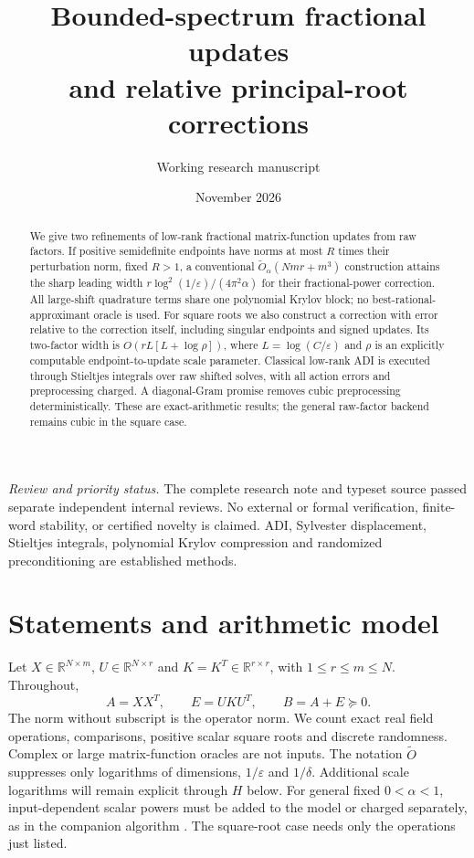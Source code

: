 \documentclass[11pt]{article}
\title{Bounded-spectrum fractional updates\protect\\
and relative principal-root corrections}
\author{Working research manuscript}
\date{November 2026}
\numberwithin{equation}{section}
\newcommand{\R}{\mathbb R}
\begin{document}
\maketitle

\begin{abstract}
We give two refinements of low-rank fractional matrix-function updates
from raw factors. If positive semidefinite endpoints have norms at most
$R$ times their perturbation norm, fixed $R>1$, a conventional
$\widetilde O_\alpha(Nmr+m^3)$ construction attains the sharp leading
width $r\log^2(1/\varepsilon)/(4\pi^2\alpha)$ for their fractional-power
correction. All large-shift quadrature terms share one polynomial Krylov
block; no best-rational-approximant oracle is used. For square roots we
also construct a correction with error relative to the correction itself,
including singular endpoints and signed updates. Its two-factor width
is $O(rL[L+\log\rho])$, where $L=\log(C/\varepsilon)$ and $\rho$ is
an explicitly computable endpoint-to-update scale parameter. Classical
low-rank ADI is executed through Stieltjes integrals over raw shifted
solves, with all action errors and preprocessing charged. A diagonal-Gram
promise removes cubic preprocessing deterministically. These are
exact-arithmetic results; the general raw-factor backend remains cubic
in the square case.
\end{abstract}

\noindent\textit{Review and priority status.}
The complete research note and typeset source passed separate independent
internal reviews. No external or formal verification, finite-word stability,
or certified novelty is claimed.
ADI, Sylvester displacement, Stieltjes integrals, polynomial Krylov
compression and randomized preconditioning are established methods.

\section{Statements and arithmetic model}

Let $X\in\R^{N\times m}$, $U\in\R^{N\times r}$ and $K=K^T\in
\R^{r\times r}$, with $1\le r\le m\le N$. Throughout,
\begin{equation}\label{eq:input}
 A=XX^T,\qquad E=UKU^T,\qquad B=A+E\succeq0.
\end{equation}
The norm without subscript is the operator norm. We count exact real
field operations, comparisons, positive scalar square roots and discrete
randomness. Complex or large matrix-function oracles are not inputs.
The notation $\widetilde O$ suppresses only logarithms of dimensions,
$1/\varepsilon$ and $1/\delta$. Additional scale logarithms will remain
explicit through $H$ below.
For general fixed $0<\alpha<1$, input-dependent scalar powers must be
added to the model or charged separately, as in the companion algorithm
\cite{Raw}. The square-root case needs only the operations just listed.
\end{document}
